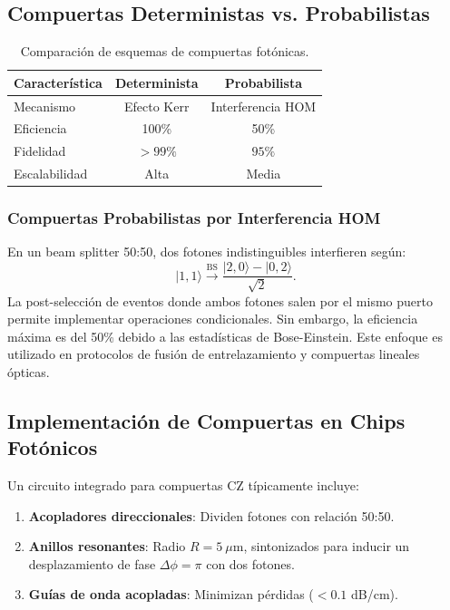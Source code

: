 \documentclass{article}
\begin{document}
\subsection*{Compuertas Deterministas vs. Probabilistas}

\begin{table}[h]
\centering
\small
\begin{tabular}{|l|c|c|}
\hline
\textbf{Característica} & \textbf{Determinista} & \textbf{Probabilista} \\
\hline
Mecanismo & Efecto Kerr & Interferencia HOM \\
Eficiencia & 100\% & 50\% \\
Fidelidad & $>99\%$ & $95\%$ \\
Escalabilidad & Alta & Media \\
\hline
\end{tabular}
\caption{Comparación de esquemas de compuertas fotónicas.}
\end{table}

\subsubsection*{Compuertas Probabilistas por Interferencia HOM}

En un beam splitter 50:50, dos fotones indistinguibles interfieren según:
\[
|1,1\rangle \xrightarrow{\text{BS}} \frac{|2,0\rangle - |0,2\rangle}{\sqrt{2}}.
\]
La post-selección de eventos donde ambos fotones salen por el mismo puerto permite implementar operaciones condicionales. Sin embargo, la eficiencia máxima es del 50\% debido a las estadísticas de Bose-Einstein. Este enfoque es utilizado en protocolos de fusión de entrelazamiento y compuertas lineales ópticas.

\subsection*{Implementación de Compuertas en Chips Fotónicos}

Un circuito integrado para compuertas CZ típicamente incluye:
\begin{enumerate}
    \item \textbf{Acopladores direccionales}: Dividen fotones con relación 50:50.
    \item \textbf{Anillos resonantes}: Radio $R = 5\ \mu\text{m}$, sintonizados para inducir un desplazamiento de fase $\Delta\phi = \pi$ con dos fotones.
    \item \textbf{Guías de onda acopladas}: Minimizan pérdidas ($<0.1$ dB/cm).
\end{enumerate}
\end{document}
